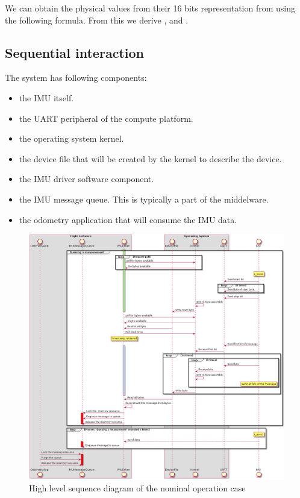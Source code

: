 We can obtain the physical values from their 16 bits representation from using the following formula.
From this we derive ,  and .

\subsection{Sequential interaction}
The system has following components:
\begin{itemize}
    \item the IMU itself.
    \item the UART peripheral of the compute platform.
    \item the operating system kernel.
    \item the device file that will be created by the kernel to describe the device.
    \item the IMU driver software component.
    \item the IMU message queue. This is typically a part of the middelware.
    \item the odometry application that will consume the IMU data.
\end{itemize}

\begin{figure}[H]
    \centering
    \includegraphics[width=1.0 \textwidth]{diagrams/high_level_sys_overview.png}
    \caption{High level sequence diagram of the nominal operation case}
    \label{fig-high-level-nominal}
\end{figure}

